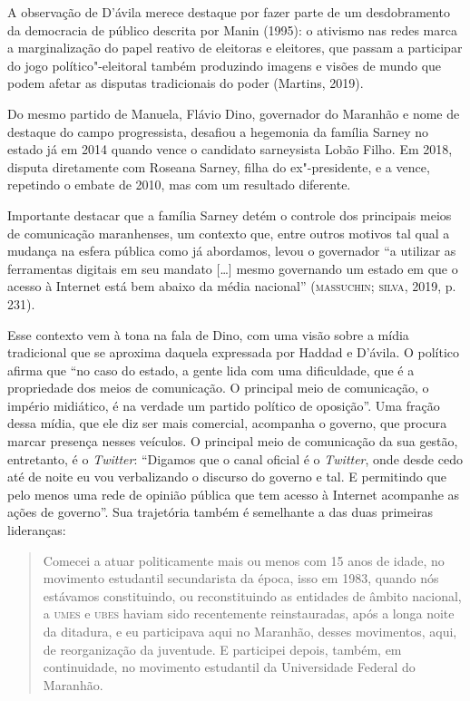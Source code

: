 A observação de D'ávila merece destaque por fazer parte de um
desdobramento da democracia de público descrita por Manin (1995): o
ativismo nas redes marca a marginalização do papel reativo de eleitoras
e eleitores, que passam a participar do jogo político"-eleitoral também
produzindo imagens e visões de mundo que podem afetar as disputas
tradicionais do poder (Martins, 2019).

Do mesmo partido de Manuela, Flávio Dino, governador do Maranhão e nome
de destaque do campo progressista, desafiou a hegemonia da família
Sarney no estado já em 2014 quando vence o candidato sarneysista Lobão
Filho. Em 2018, disputa diretamente com Roseana Sarney, filha do
ex"-presidente, e a vence, repetindo o embate de 2010, mas com um
resultado diferente.

Importante destacar que a família Sarney detém o controle dos principais
meios de comunicação maranhenses, um contexto que, entre outros motivos
tal qual a mudança na esfera pública como já abordamos, levou o
governador ``a utilizar as ferramentas digitais em seu mandato {[}\ldots{}{]}
mesmo governando um estado em que o acesso à Internet está bem abaixo da
média nacional'' (\textsc{massuchin}; \textsc{silva}, 2019, p. 231).

Esse contexto vem à tona na fala de Dino, com uma visão sobre a mídia
tradicional que se aproxima daquela expressada por Haddad e D'ávila. O
político afirma que ``no caso do estado, a gente lida com uma
dificuldade, que é a propriedade dos meios de comunicação. O principal
meio de comunicação, o império midiático, é na verdade um partido
político de oposição''. Uma fração dessa mídia, que ele diz ser mais
comercial, acompanha o governo, que procura marcar presença nesses
veículos. O principal meio de comunicação da sua gestão, entretanto, é o
\emph{Twitter}: ``Digamos que o canal oficial é o \emph{Twitter}, onde
desde cedo até de noite eu vou verbalizando o discurso do governo e tal.
E permitindo que pelo menos uma rede de opinião pública que tem acesso à
Internet acompanhe as ações de governo''. Sua trajetória também é
semelhante a das duas primeiras lideranças:

\begin{quote}
Comecei a atuar politicamente mais ou menos com 15 anos de idade, no
movimento estudantil secundarista da época, isso em 1983, quando nós
estávamos constituindo, ou reconstituindo as entidades de âmbito
nacional, a \textsc{umes} e \textsc{ubes} haviam sido recentemente reinstauradas, após a
longa noite da ditadura, e eu participava aqui no Maranhão, desses
movimentos, aqui, de reorganização da juventude. E participei depois,
também, em continuidade, no movimento estudantil da Universidade Federal
do Maranhão.
\end{quote}

